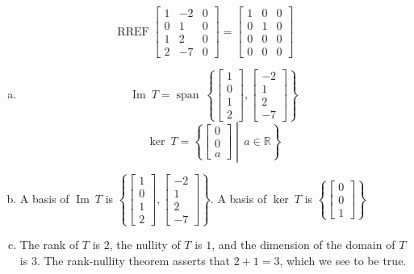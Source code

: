 \begin{exerciseAnswer} 


\[\operatorname{RREF} \left[\begin{array}{ccc}
1 & -2 & 0 \\
0 & 1 & 0 \\
1 & 2 & 0 \\
2 & -7 & 0
\end{array}\right] = \left[\begin{array}{ccc}
1 & 0 & 0 \\
0 & 1 & 0 \\
0 & 0 & 0 \\
0 & 0 & 0
\end{array}\right] \]


\begin{enumerate}[(a)]
\item \[\operatorname{Im}\ T = \operatorname{span}\  \left\{ \left[\begin{array}{c}
1 \\
0 \\
1 \\
2
\end{array}\right] , \left[\begin{array}{c}
-2 \\
1 \\
2 \\
-7
\end{array}\right] \right\} \]\[\operatorname{ker}\ T =  \left\{ \left[\begin{array}{c}
0 \\
0 \\
a
\end{array}\right] \middle|\,a\in\mathbb{R}\right\} \]
\item  A basis of \(\operatorname{Im}\ T\) is \( \left\{ \left[\begin{array}{c}
1 \\
0 \\
1 \\
2
\end{array}\right] , \left[\begin{array}{c}
-2 \\
1 \\
2 \\
-7
\end{array}\right] \right\} \). A basis of \(\operatorname{ker}\ T\) is \( \left\{ \left[\begin{array}{c}
0 \\
0 \\
1
\end{array}\right] \right\} \)
\item  The rank of \(T\) is \( 2 \), the nullity of \(T\) is \( 1 \), and the dimension of the domain of \(T\) is \( 3 \). The rank-nullity theorem asserts that \( 2 + 1 = 3 \), which we see to be true. 
\end{enumerate}
    
\end{exerciseAnswer}
    
